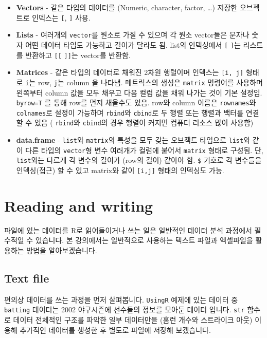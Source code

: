 \documentclass[
]{book}
\providecommand{\tightlist}{%
  \setlength{\itemsep}{0pt}\setlength{\parskip}{0pt}}
\begin{document}
\begin{itemize}
\tightlist
\item
  \textbf{Vectors} - 같은 타입의 데이터를 (Numeric, character, factor, \ldots) 저장한 오브젝트로 인덱스는 \texttt{{[}}, \texttt{{]}} 사용.
\item
  \textbf{Lists} - 여러개의 \texttt{vector}를 원소로 가질 수 있으며 각 원소 vector들은 문자나 숫자 어떤 데이터 타입도 가능하고 길이가 달라도 됨. list의 인덱싱에서 \texttt{{[}} \texttt{{]}}는 리스트를 반환하고 \texttt{{[}{[}} \texttt{{]}{]}}는 vector를 반환함.
\item
  \textbf{Matrices} - 같은 타입의 데이터로 채워진 2차원 행렬이며 인덱스는 \texttt{{[}i,\ j{]}} 형태로 \texttt{i}는 row, \texttt{j}는 column 을 나타냄. 메트릭스의 생성은 \texttt{matrix} 명령어를 사용하며 왼쪽부터 column 값을 모두 채우고 다음 컬럼 값을 채워 나가는 것이 기본 설정임. \texttt{byrow=T} 를 통해 row를 먼저 채울수도 있음. row와 column 이름은 \texttt{rownames}와 \texttt{colnames}로 설정이 가능하며 \texttt{rbind}와 \texttt{cbind}로 두 행렬 또는 행렬과 백터를 연결할 수 있음 ( \texttt{rbind}와 \texttt{cbind}의 경우 행렬이 커지면 컴퓨터 리소스 많이 사용함)
\item
  \textbf{data.frame} - \texttt{list}와 \texttt{matrix}의 특성을 모두 갖는 오브젝트 타입으로 \texttt{list}와 같이 다른 타입의 \texttt{vector}형 변수 여러개가 컬럼에 붙어서 \texttt{matrix} 형태로 구성됨. 단, \texttt{list}와는 다르게 각 변수의 길이가 (row의 길이) 같아야 함. \texttt{\$} 기호로 각 변수들을 인덱싱(접근) 할 수 있고 matrix와 같이 \texttt{{[}i,j{]}} 형태의 인덱싱도 가능.
\end{itemize}

\hypertarget{reading-and-writing}{%
\section{Reading and writing}\label{reading-and-writing}}

파일에 있는 데이터를 R로 읽어들이거나 쓰는 일은 일반적인 데이터 분석 과정에서 필수적일 수 있습니다. 본 강의에서는 일반적으로 사용하는 텍스트 파일과 엑셀파일을 활용하는 방법을 알아보겠습니다.

\hypertarget{text-file}{%
\subsection{Text file}\label{text-file}}

편의상 데이터를 쓰는 과정을 먼저 살펴봅니다. \texttt{UsingR} 예제에 있는 데이터 중 \texttt{batting} 데이터는 2002 야구시즌에 선수들의 정보를 모아둔 데이터 입니다. \texttt{str} 함수로 데이터 전체적인 구조를 파악한 일부 데이터만을 (홈런 개수와 스트라이크 아웃) 이용해 추가적인 데이터를 생성한 후 별도로 파일에 저장해 보겠습니다.
\end{document}
